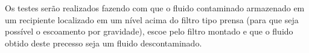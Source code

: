 Os testes serão realizados fazendo com que o fluido contaminado armazenado em um
recipiente localizado em um nível acima do filtro tipo prensa (para que seja
possível o escoamento por gravidade), escoe pelo filtro montado e que o fluido
obtido deste precesso seja um fluido descontaminado.

